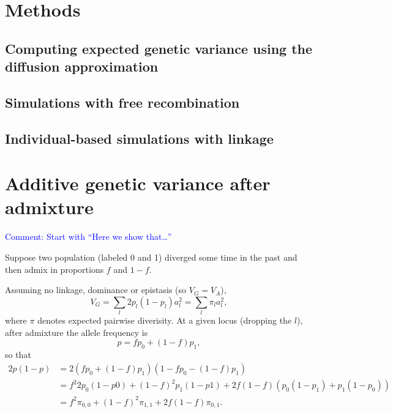 \documentclass{article}
\newcommand{\aprcomment}[1]{{\textcolor{blue}{Comment: #1}}}
\begin{document}
\section*{Methods}

\subsection*{Computing expected genetic variance using the diffusion approximation}

\subsection*{Simulations with free recombination}

\subsection*{Individual-based simulations with linkage}




\appendix

\section{Additive genetic variance after admixture}\label{sec:VG-admixture}

\aprcomment{Start with ``Here we show that\dots''}

Suppose two population (labeled 0 and 1) diverged some time in the past and
then admix in proportions $f$ and $1-f$.

Assuming no linkage, dominance or epistasis (so \(V_G=V_A\)),
\[V_G = \sum_l 2p_l(1-p_l)a_l^2 = \sum_l \pi_l a_l^2,\]
where $\pi$ denotes expected pairwise diverisity.
At a given locus (dropping the $l$), after admixture the allele frequency is
\[p=f p_0 + (1-f) p_1,\]
so that
\begin{align*}
    2p(1-p) & = 2(f p_0 + (1-f) p_1)(1 - f p_0 - (1-f) p_1) \\
    & = f^2 2p_0(1-p0) + (1-f)^2 p_1(1-p1) + 2f(1-f) (p_0(1-p_1) + p_1(1-p_0)) \\
    & = f^2 \pi_{0,0} + (1-f)^2 \pi_{1,1} + 2f(1-f)\pi_{0,1}.
\end{align*}
\end{document}
